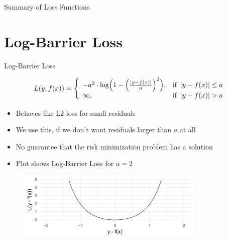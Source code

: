 \begin{vbframe}{Summary of Loss Functions}



\end{vbframe}


\section{Log-Barrier Loss}

\begin{vbframe}{Log-Barrier Loss}

\begin{footnotesize}
\[
  L(y, f(x)) = \left\{\begin{array}{lr}
        -a^{2} \cdot \log \Bigl( 1 - \Bigl(\frac{\left|y - f(x)\right|}{a}\Bigr)^2 \Bigr), & \text{if } \left|y-f(x)\right| \leq a \\
        \infty, & \text{if } \left|y-f(x)\right|  > a
        \end{array}\right.
  \]
\end{footnotesize}
\begin{itemize}
\item Behaves like L2 loss for small residuals
\item We use this, if we don't want residuals larger than $a$ at all
\item No guarantee that the risk minimization problem has a solution
\item Plot shows Log-Barrier Loss for $a=2$
\end{itemize}

\begin{figure}
\includegraphics[width = 0.8\textwidth]{figure_man/log-barrier01.png}
\end{figure}


\end{vbframe}


